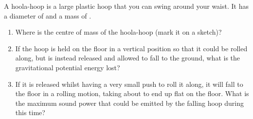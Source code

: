 
\begin{problem}[Robin7]
{A hoola-hoop is a large plastic hoop that you can swing around your waist.  It has a diameter of  and a mass of .
\begin{enumerate}
	\item Where is the centre of mass of the hoola-hoop (mark it on a sketch)?
	\item If the hoop is held on the floor in a vertical position so that it could be rolled along, but is instead released and allowed to fall to the ground, what is the gravitational potential energy lost?
	\item If it is released whilst having a very small push to roll it along, it will fall to the floor in a rolling motion, taking about  to end up flat on the floor. What is the maximum sound power that could be emitted by the falling hoop during this time?
\end{enumerate}
}
{}
{}
\end{problem}